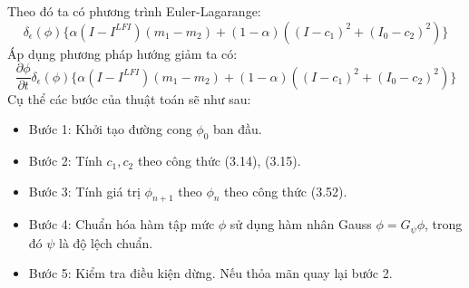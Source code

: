 \documentclass[12pt, oneside, a4paper]{book}
\begin{document}
Theo đó ta có phương trình Euler-Lagarange:
\begin{equation*}
\delta_{\epsilon}(\phi)\lbrace\alpha(I-I^{LFI})(m_1-m_2)+(1-\alpha)((I-c_1)^2+ (I_0-c_2)^2)\rbrace
\end{equation*}
Áp dụng phương pháp hướng giảm ta có:
\begin{equation}
\dfrac{\partial \phi}{\partial t} \delta_{\epsilon}(\phi)\lbrace\alpha(I-I^{LFI})(m_1-m_2)+(1-\alpha)((I-c_1)^2+ (I_0-c_2)^2)\rbrace
\end{equation}
Cụ thể các bước của thuật toán sẽ như sau:
\begin{itemize}
\item Bước 1: Khởi tạo đường cong $\phi_0$ ban đầu.
\item Bước 2: Tính $c_1, c_2$ theo công thức  (3.14), (3.15).
\item Bước 3: Tính giá trị $\phi_{n+1}$ theo $\phi_{n}$ theo công thức (3.52).
\item Bước 4: Chuẩn hóa hàm tập mức $\phi$ sử dụng hàm nhân Gauss $\phi=G_{\psi}\phi$, trong đó $\psi$ là độ lệch chuẩn.
\item Bước 5: Kiểm tra điều kiện dừng. Nếu thỏa mãn quay lại bước 2.
\end{itemize}
\end{document}
